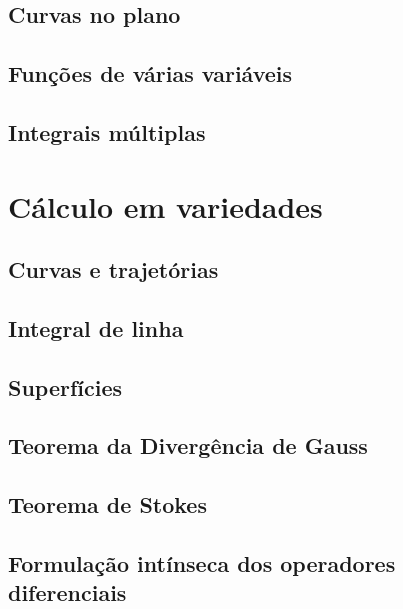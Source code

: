 \documentclass[symmetric,a4paper,justified]{tufte-book}
\begin{document}
\chapter{Curvas no plano}


\chapter{Funções de várias variáveis}

\chapter{Integrais múltiplas}



\part{Cálculo em variedades}

\chapter{Curvas e trajetórias}
\chapter{Integral de linha}
\chapter{Superfícies}
\chapter{Teorema da Divergência de Gauss}
\chapter{Teorema de Stokes}
\chapter{Formulação intínseca dos operadores diferenciais}
















\backmatter





\printindex
\end{document}
